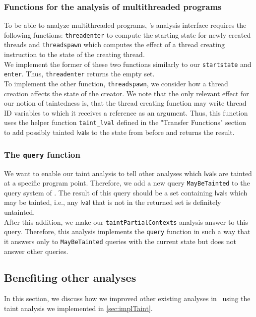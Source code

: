       \subsubsection{Functions for the analysis of multithreaded programs}
        To be able to analyze multithreaded programs, \gob's analysis interface requires the following functions: \texttt{threadenter} to compute the starting state for newly created threads and \texttt{threadspawn} which computes the effect of a thread creating instruction to the state of the creating thread.\\
        We implement the former of these two functions similarly to our \texttt{startstate} and \texttt{enter}. Thus, \texttt{threadenter} returns the empty set.\\
        To implement the other function, \texttt{threadspawn}, we consider how a thread creation affects the state of the creator. We note that the only relevant effect for our notion of taintedness is, that the thread creating function may write thread ID variables to which it receives a reference as an argument. Thus, this function uses the helper function \texttt{taint\_lval} defined in the "Transfer Functions" section to add possibly tainted $\textsf{lval}$s to the state from before and returns the result.

      \subsubsection{The \texttt{query} function}
        We want to enable our taint analysis to tell other analyses which $\textsf{lval}$s are tainted at a specific program point. Therefore, we add a new query \texttt{MayBeTainted} to the query system of \gob. The result of this query should be a set containing $\textsf{lval}$s which may be tainted, i.e., any $\textsf{lval}$ that is not in the returned set is definitely untainted.\\
        After this addition, we make our \texttt{taintPartialContexts} analysis answer to this query. Therefore, this analysis implements the \texttt{query} function in such a way that it answers only to \texttt{MayBeTainted} queries with the current state but does not answer other queries.

    \subsection{Benefiting other analyses}\label{sec:improveVariableAnalyses}
    In this section, we discuss how we improved other existing analyses in \gob\ using the taint analysis we implemented in \autoref{sec:implTaint}.
